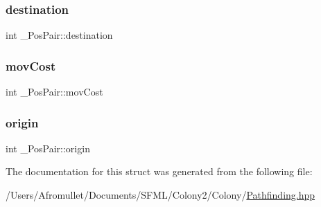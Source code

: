 \subsubsection{\texorpdfstring{destination}{destination}}
{\footnotesize\ttfamily int \+\_\+\+Pos\+Pair\+::destination}

\mbox{\label{struct___pos_pair_abf7f6970e1ace7a4f1cdc3179886e21d}} 
\subsubsection{\texorpdfstring{mov\+Cost}{movCost}}
{\footnotesize\ttfamily int \+\_\+\+Pos\+Pair\+::mov\+Cost}

\mbox{\label{struct___pos_pair_a18ef19735976df84d1dda3185b844da0}} 
\subsubsection{\texorpdfstring{origin}{origin}}
{\footnotesize\ttfamily int \+\_\+\+Pos\+Pair\+::origin}



The documentation for this struct was generated from the following file\+:\begin{DoxyCompactItemize}
\item 
/\+Users/\+Afromullet/\+Documents/\+S\+F\+M\+L/\+Colony2/\+Colony/\mbox{\hyperlink{_pathfinding_8hpp}{Pathfinding.\+hpp}}\end{DoxyCompactItemize}
